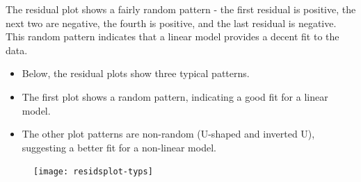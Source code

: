 \documentclass[residuals.tex]{subfiles}
\begin{document}
The residual plot shows a fairly random pattern - the first residual is positive, the next two are negative, the fourth is positive, and the last residual is negative. This random pattern indicates that a linear model provides a decent fit to the data.

\newpage
\begin{itemize}
\item Below, the residual plots show three typical patterns. 
\item The first plot shows a random pattern, indicating a good fit for a linear model. 
\item The other plot patterns are non-random (U-shaped and inverted U), suggesting a better fit for a non-linear model.
\end{itemize}



		
\begin{figure}
\centering
\texttt{[image: residsplot-typs]}
\end{figure}
\end{document}
